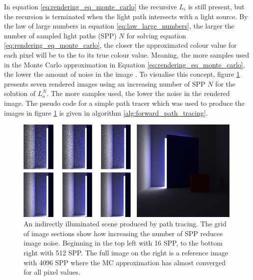 \documentclass[../dissertation.tex]{subfiles}
\begin{document}
In equation \ref{eq:rendering_eq_monte_carlo} the recursive $L_i$ is still present, but the recursion is terminated when the light path intersects with a light source. By the law of large numbers in equation \ref{eq:law_large_numbers}, the larger the number of sampled light paths (SPP) $N$ for solving equation \ref{eq:rendering_eq_monte_carlo}, the closer the approximated colour value for each pixel will be to the to its true colour value. Meaning, the more samples used in the Monte Carlo approximation in Equation \ref{eq:rendering_eq_monte_carlo}, the lower the amount of noise in the image \cite{christensen2016path}. To visualise this concept, figure \ref{fig:reduce_noise_spp_example} presents seven rendered images using an increasing number of SPP $N$ for the solution of $L_o^N$. The more samples used, the lower the noise in the rendered image. The pseudo code for a simple path tracer which was used to produce the images in figure \ref{fig:reduce_noise_spp_example} is given in algorithm \ref{alg:forward_path_tracing}.

\begin{figure}[h]
\begin{center}
\includegraphics[width=0.99\textwidth]{images/renders/noise_reduction_default/increasing_samples.png}    
\end{center}
\caption{An indirectly illuminated scene produced by path tracing. The grid of image sections show how increasing the number of SPP reduces image noise. Beginning in the top left with 16 SPP, to the bottom right with 512 SPP. The full image on the right is a reference image with 4096 SPP where the MC approximation has almost converged for all pixel values.}
\label{fig:reduce_noise_spp_example}
\end{figure}
\end{document}
